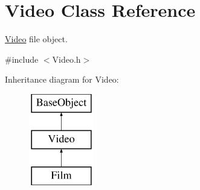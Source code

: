 \hypertarget{classVideo}{\section{Video Class Reference}
\label{classVideo}
}


\hyperlink{classVideo}{Video} file object.  




{\ttfamily \#include $<$Video.\+h$>$}

Inheritance diagram for Video\+:\begin{figure}[H]
\begin{center}
\leavevmode
\includegraphics[height=4.000000cm]{classVideo}
\end{center}
\end{figure}
